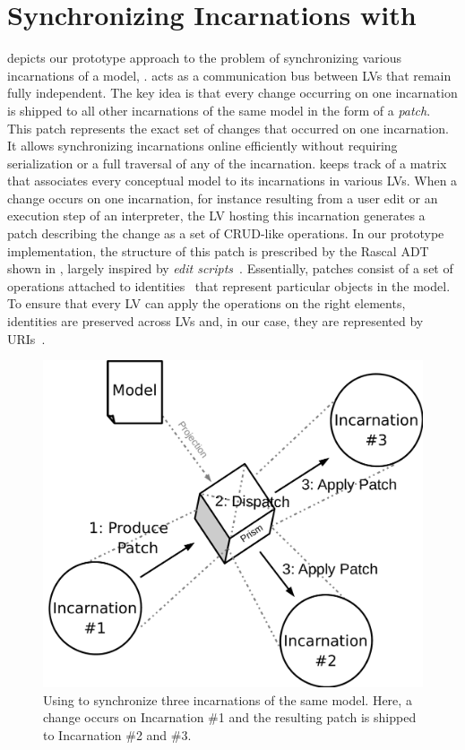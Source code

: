\section{Synchronizing Incarnations with \prism}
\label{sec:prism}

 depicts our prototype approach to the problem of synchronizing various incarnations of a model, \prism.
\prism acts as a communication bus between LVs that remain fully independent.
The key idea is that every change occurring on one incarnation is shipped to all other incarnations of the same model in the form of a \emph{patch}.
This patch represents the exact set of changes that occurred on one incarnation.
It allows synchronizing incarnations online efficiently without requiring serialization or a full traversal of any of the incarnation.
\prism keeps track of a matrix that associates every conceptual model to its incarnations in various LVs.
When a change occurs on one incarnation, for instance resulting from a user edit or an execution step of an interpreter, the LV hosting this incarnation generates a patch describing the change as a set of CRUD-like operations.
In our prototype implementation, the structure of this patch is prescribed by the Rascal ADT shown in , largely inspired by \emph{edit scripts}~\cite{rozen2017towards}.
Essentially, patches consist of a set of operations attached to identities~\cite{klint2016model} that represent particular objects in the model.
To ensure that every LV can apply the operations on the right elements, identities are preserved across LVs and, in our case, they are represented by URIs~\cite{berners2004uniform}.


\begin{figure}[bt]
	\centering
	\includegraphics[width=.6\columnwidth]{figures/prism}
	\caption{Using \prism to synchronize three incarnations of the same model. Here, a change occurs on Incarnation \#1 and the resulting patch is shipped to Incarnation \#2 and \#3.}
	\label{fig:prism}
\end{figure}


